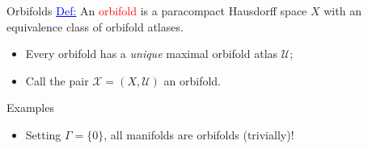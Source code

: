 \begin{frame}{Orbifolds}
    \textcolor{blue}{\underline{Def:}} An \textcolor{red}{orbifold} is a paracompact Hausdorff space $X$ with an equivalence class of orbifold atlases.
    \begin{itemize}
        \item Every orbifold has a \emph{unique} maximal orbifold atlas $\mathcal{U}$;
        \item Call the pair $\mathcal{X} = (X, \mathcal{U})$ an orbifold.
    \end{itemize}
\end{frame}

\begin{frame}{Examples}
    \begin{itemize}
        \item Setting $\Gamma = \{0\}$, all manifolds are orbifolds (trivially)!
    \end{itemize}
\end{frame}